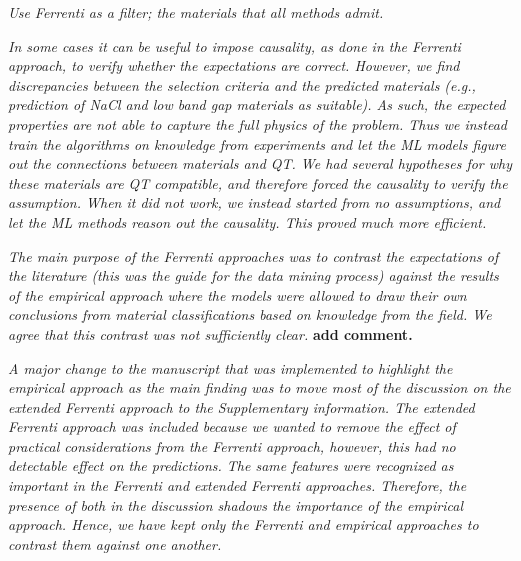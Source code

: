 \documentclass[11pt, a4paper]{letter} %
\begin{document}
\textit{Use Ferrenti as a filter; the materials that all methods admit.} 

\textit{In some cases it can be useful to impose causality, as done in the Ferrenti approach, to verify whether the expectations are correct. 
However, we find discrepancies between the selection criteria and the predicted materials (e.g., prediction of NaCl and low band gap materials as suitable).
As such, the expected properties are not able to capture the full physics of the problem.
Thus we instead train the algorithms on knowledge from experiments and let the ML models figure out the connections between materials and QT. 
We had several hypotheses for why these materials are QT compatible, and therefore forced the causality to verify the assumption.
When it did not work, we instead started from no assumptions, and let the ML methods reason out the causality.
This proved much more efficient. } 

\textit{The main purpose of the Ferrenti approaches was to contrast the expectations of the literature (this was the guide for the data mining process) against the results of the empirical approach where the models were allowed to draw their own conclusions from material classifications  based on knowledge from the field.
We agree that this contrast was not sufficiently clear.}
\textbf{add comment. }

\textit{A major change to the manuscript that was implemented to highlight the empirical approach as the main finding was to move most of the discussion on the extended Ferrenti approach to the Supplementary information.
The extended Ferrenti approach was included because we wanted to remove the effect of practical considerations from the Ferrenti approach, however, this had no detectable effect on the predictions.
The same features were recognized as important in the Ferrenti and extended Ferrenti approaches.
Therefore, the presence of both in the discussion shadows the importance of the empirical approach.
Hence, we have kept only the Ferrenti and empirical approaches to contrast them against one another. }
\end{document}
